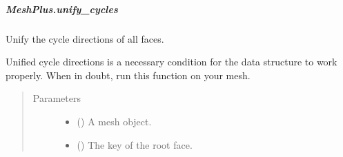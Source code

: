 \documentclass[letterpaper,10pt,english]{sphinxmanual}
\begin{document}
\begin{fulllineitems}
\begin{fulllineitems}
\begin{sphinxVerbatim}[commandchars=\\\{\}]
  
  \PYG{p}{[}  \PYG{p}{]}   
   
\end{sphinxVerbatim}

\end{fulllineitems}



\subparagraph{MeshPlus.unify\_cycles}
\label{\detokenize{api/generated/directional_clustering.mesh.MeshPlus.unify_cycles:meshplus-unify-cycles}}\label{\detokenize{api/generated/directional_clustering.mesh.MeshPlus.unify_cycles::doc}}

\begin{fulllineitems}
\label{\detokenize{api/generated/directional_clustering.mesh.MeshPlus.unify_cycles:directional_clustering.mesh.MeshPlus.unify_cycles}}
Unify the cycle directions of all faces.

Unified cycle directions is a necessary condition for the data structure to
work properly. When in doubt, run this function on your mesh.
\begin{quote}\begin{description}
\item[{Parameters}] \leavevmode\begin{itemize}
\item {} 
 () \textendash{} A mesh object.

\item {} 
 () \textendash{} The key of the root face.


\end{itemize}
\end{description}
\end{quote}
\end{fulllineitems}
\end{fulllineitems}
\end{document}
